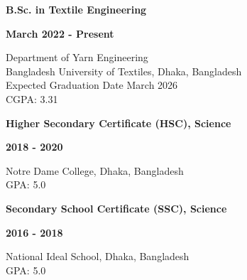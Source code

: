 \noindent
\begin{minipage}[t]{0.50\textwidth}
    \raggedright
    {\fontsize{12pt}{15pt}\bfseries B.Sc. in Textile Engineering}
\end{minipage}%
\hfill
\begin{minipage}[t]{0.50\textwidth}
    \raggedleft
    {\fontsize{12pt}{15pt}\bfseries March 2022 - Present}
\end{minipage}
Department of Yarn Engineering\\
Bangladesh University of Textiles, Dhaka, Bangladesh\\
Expected Graduation Date March 2026\\
CGPA: 3.31\par
\vspace{0.3em}

\noindent
\begin{minipage}[t]{0.50\textwidth}
    \raggedright
    {\fontsize{12pt}{15pt}\bfseries Higher Secondary Certificate (HSC), Science}
\end{minipage}%
\hfill
\begin{minipage}[t]{0.50\textwidth}
    \raggedleft
    {\fontsize{12pt}{15pt}\bfseries 2018 - 2020}
\end{minipage}
Notre Dame College, Dhaka, Bangladesh\\
GPA: 5.0\par
\vspace{0.3em}

\noindent
\begin{minipage}[t]{0.50\textwidth}
    \raggedright
    {\fontsize{12pt}{15pt}\bfseries Secondary School Certificate (SSC), Science}
\end{minipage}%
\hfill
\begin{minipage}[t]{0.50\textwidth}
    \raggedleft
    {\fontsize{12pt}{15pt}\bfseries 2016 - 2018}
\end{minipage}
National Ideal School, Dhaka, Bangladesh\\
GPA: 5.0\par
\vspace{0.3em}